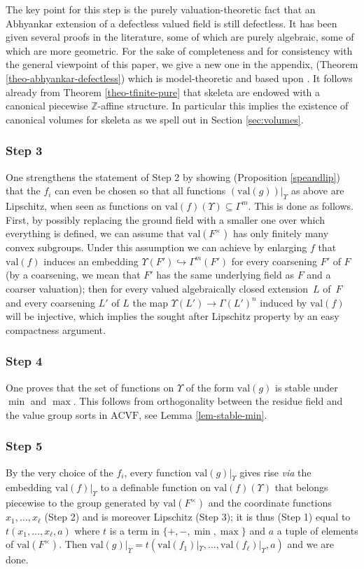 \documentclass[JEP,XML,SOM,Unicode,ThmDefs,NoEqCountersInSection,published]{cedram}
\newcommand{\val}{\mathrm{val}}
\newcommand{\acvf}{\mathrm{ACVF}}
\newcommand{\Z}{\mathbb Z}
\let\subset\subseteq
\theoremstyle{plain}
\theoremstyle{definition}
\begin{document}
The key point for this step is the purely valuation-theoretic
fact that an Abhyankar extension of a defectless valued field is still defectless.
It has been given several proofs in the literature,
some of which are purely algebraic, some of which are
more geometric. For the sake of completeness and for consistency with the general viewpoint of this paper, we give a new one in the appendix,
(Theorem \ref{theo-abhyankar-defectless}) which is model-theoretic and based upon \cite{HL}.
It follows already from Theorem \ref{theo-tfinite-pure} that skeleta are endowed with a canonical piecewise
$\Z$-affine structure. In particular this implies the existence of canonical volumes for skeleta as we spell out in Section \ref{sec:volumes}.

\subsubsection*{Step 3}
One strengthens the statement of
Step 2 by showing (Proposition \ref{speandlip})
that the $f_i$ can even be chosen so that all
functions $(\val (g))|_\Upsilon$ as above are Lipschitz, when seen as functions
on $\val (f) (\Upsilon)\subset\Gamma^m$.
This
is done as follows. First, by possibly replacing the ground field with a smaller one over which everything
is defined, we can assume that $\val(F^\times)$ has only finitely many convex subgroups. Under
this assumption we can achieve by enlarging $f$
that $\val (f)$ induces an embedding $\Upsilon(F')\hookrightarrow \Gamma^m(F')$ for every coarsening $F'$ of $F$
(by a coarsening, we mean that $F'$ has the same underlying field as $F$ and a coarser valuation); then
for every valued
algebraically closed extension~$L$ of~$F$ and every coarsening $L'$ of $L$ the map $\Upsilon(L')\to \Gamma(L')^n$
induced by $\val (f)$ will be injective, which implies the sought after Lipschitz property by an easy compactness argument.

\subsubsection*{Step 4}
One proves that the set of functions on $\Upsilon$ of the form $\val (g)$ is stable under $\min$ and $\max$.
This follows from orthogonality between the residue field and the value group sorts
in $\acvf$, see Lemma \ref{lem-stable-min}.

\subsubsection*{Step 5}
By the very choice of the $f_i$, every function $\val(g)|_{\Upsilon}$
gives rise \textit{via} the embedding $\val(f)|_{\Upsilon}$ to a definable function on $\val (f)(\Upsilon)$ that
belongs piecewise to the group
generated by
$\val (F^\times)$ and the coordinate functions $x_1,\ldots,x_\ell$ (Step 2) and is moreover Lipschitz (Step 3); it is thus (Step 1) equal to
$t(x_1,\ldots, x_\ell,a)$ where $t$ is a term in $\{+,-,\min,\max\}$ and $a$ a tuple of elements of $\val(F^\times)$. Then $\val (g)|_{\Upsilon}
=t(\val(f_1)|_{\Upsilon}, \ldots, \val(f_\ell)|_{\Upsilon},a)$ and we are done.
\end{document}
